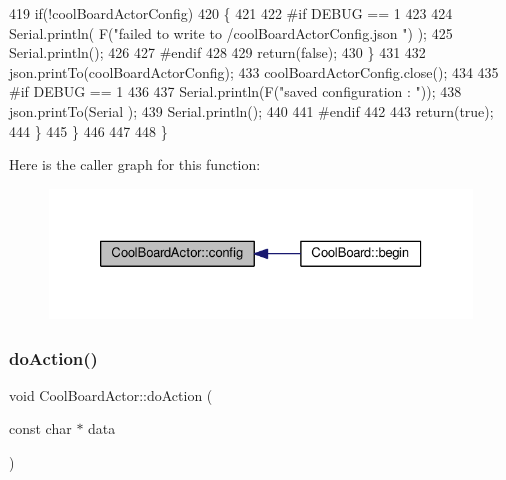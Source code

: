 \begin{DoxyCode}
419             \textcolor{keywordflow}{if}(!coolBoardActorConfig)
420             \{
421             
422 \textcolor{preprocessor}{            #if DEBUG == 1 }
423 
424                 Serial.println( F(\textcolor{stringliteral}{"failed to write to /coolBoardActorConfig.json "}) );
425                 Serial.println();
426             
427 \textcolor{preprocessor}{            #endif}
428                 
429                 \textcolor{keywordflow}{return}(\textcolor{keyword}{false});          
430             \}  
431 
432             json.printTo(coolBoardActorConfig);
433             coolBoardActorConfig.close();
434 
435 \textcolor{preprocessor}{        #if DEBUG == 1 }
436             
437             Serial.println(F(\textcolor{stringliteral}{"saved configuration : "}));
438             json.printTo(Serial );
439             Serial.println();       
440         
441 \textcolor{preprocessor}{        #endif}
442 
443             \textcolor{keywordflow}{return}(\textcolor{keyword}{true}); 
444         \}
445     \}   
446     
447 
448 \}
\end{DoxyCode}
Here is the caller graph for this function\+:\nopagebreak
\begin{figure}[H]
\begin{center}
\leavevmode
\includegraphics[width=326pt]{dc/d69/class_cool_board_actor_a5af5538fc7d169f63127e06d5219bcd4_icgraph}
\end{center}
\end{figure}
\mbox{\label{class_cool_board_actor_a96a45658d32c6b95caa2f385c7da32cd}} 
\subsubsection{\texorpdfstring{do\+Action()}{doAction()}}
{\footnotesize\ttfamily void Cool\+Board\+Actor\+::do\+Action (\begin{DoxyParamCaption}\item[{const char $\ast$}]{data }\end{DoxyParamCaption})}

